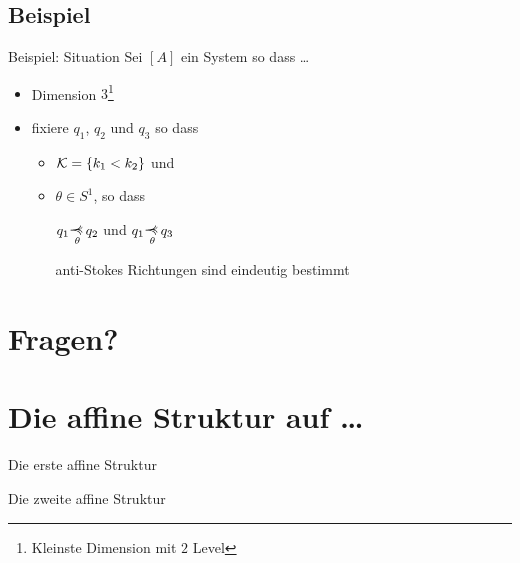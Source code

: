 \subsection{Beispiel}
\begin{frame}{Beispiel: Situation}
  Sei $[A]$ ein System so dass \dots
  \begin{itemize}
  \item
    Dimension $3$\footnote{Kleinste Dimension mit $2$ Level}
  \item
    fixiere $q_1$, $q_2$ und $q_3$ so dass
    \begin{itemize}
    \item $\mathcal{K}=\{k_1<k_2\}$ und
    \item $\theta\in S^1$, so dass
      \begin{einr}
        $q_1\myrel{\theta}q_2$ und $q_1\myrel{\theta}q_3$

        \Rightarrow{} anti-Stokes Richtungen sind eindeutig bestimmt
      \end{einr}
    \end{itemize}
  \end{itemize}
\end{frame}

\section*{Fragen?}

\section{Die affine Struktur auf \dots}
\begin{frame}{Die erste affine Struktur}

\end{frame}
\begin{frame}{Die zweite affine Struktur}

\end{frame}

